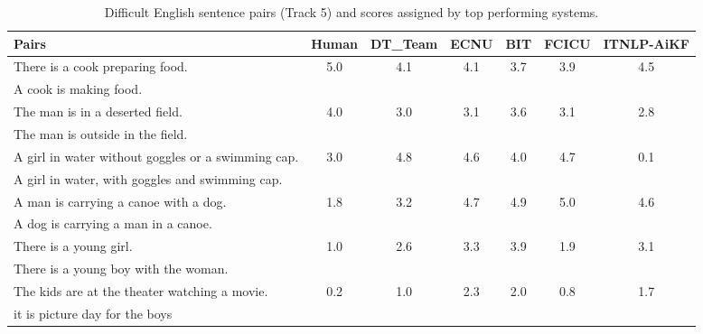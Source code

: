 \documentclass[11pt,a4paper]{article}
\begin{document}
\begin{table*}[htp!!]
\small
\begin{center}
\centering
\begin{tabular}{|l|c|c|c|c|c|c|}
\hline
Pairs  & {\footnotesize Human} & 
{\footnotesize DT\_Team }& {\footnotesize ECNU }& {\footnotesize BIT} &  {\footnotesize FCICU }& {\footnotesize ITNLP-AiKF } \\
\hline
There is a cook preparing food. &  5.0 & 4.1 & 4.1 & 3.7 & 3.9 & 4.5 \\
A cook is making food.  & & & & & & \\
\hline
The man is in a deserted field.  & 4.0 & 3.0 & 3.1 & 3.6 & 3.1 & 2.8 \\
The man is outside in the field. & & & & & & \\ 

\hline
A girl in water without goggles or a swimming cap. & 3.0 & 4.8 & 4.6 & 4.0 & 4.7 & 0.1 \\
A girl in water, with goggles and swimming cap. & & & & & & \\
\hline
A man is carrying a canoe with a dog.  & 1.8 & 3.2 & 4.7 & 4.9 & 5.0 & 4.6 \\
A dog is carrying a man in a canoe. & & & & & & \\
\hline
There is a young girl. & 1.0 & 2.6 & 3.3 & 3.9 & 1.9 & 3.1 \\
There is a young boy with the woman. & & & & & & \\
\hline
The kids are at the theater watching a movie. & 0.2 & 1.0 & 2.3 & 2.0 & 0.8 & 1.7  \\
it is picture day for the boys & & & & & & \\
\hline
\end{tabular}
\end{center}
\caption[Example sentence pairs]{Difficult English sentence pairs (Track 5) and scores assigned by top performing systems.\footnotemark}
\label{tab:difficultpairs}
\end{table*}
 
\end{document}
